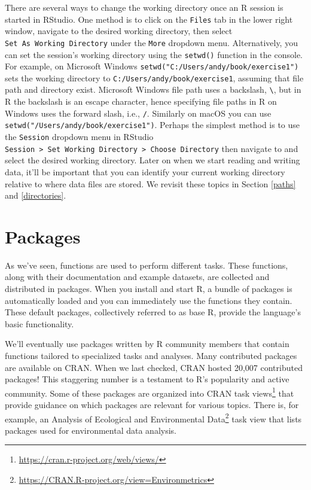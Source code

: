 \documentclass[
  11pt,
]{krantz}
\renewcommand{\href}[2]{#2\footnote{\url{#1}}}
\theoremstyle{definition}
\theoremstyle{definition}
\theoremstyle{definition}
\theoremstyle{definition}
\theoremstyle{remark}
\begin{document}
There are several ways to change the working directory once an R session is started in RStudio. One method is to click on the \texttt{Files} tab in the lower right window, navigate to the desired working directory, then select \texttt{Set\ As\ Working\ Directory} under the \texttt{More} dropdown menu. Alternatively, you can set the session's working directory using the \texttt{setwd()} function in the console. For example, on Microsoft Windows \texttt{setwd("C:/Users/andy/book/exercise1")} sets the working directory to \texttt{C:/Users/andy/book/exercise1}, assuming that file path and directory exist. Microsoft Windows file path uses a backslash, \texttt{\textbackslash{}}, but in R the backslash is an escape character, hence specifying file paths in R on Windows uses the forward slash, i.e., \texttt{/}. Similarly on macOS you can use \texttt{setwd("/Users/andy/book/exercise1")}. Perhaps the simplest method is to use the \texttt{Session} dropdown menu in RStudio \texttt{Session\ \textgreater{}\ Set\ Working\ Directory\ \textgreater{}\ Choose\ Directory} then navigate to and select the desired working directory. Later on when we start reading and writing data, it'll be important that you can identify your current working directory relative to where data files are stored. We revisit these topics in Section \ref{paths} and \ref{directories}.

\hypertarget{packages}{%
\section{Packages}\label{packages}}

As we've seen, functions are used to perform different tasks. These functions, along with their documentation and example datasets, are collected and distributed in packages. When you install and start R, a bundle of packages is automatically loaded and you can immediately use the functions they contain. These default packages, collectively referred to as base R, provide the language's basic functionality.

We'll eventually use packages written by R community members that contain functions tailored to specialized tasks and analyses. Many contributed packages are available on CRAN. When we last checked, CRAN hosted 20,007 contributed packages! This staggering number is a testament to R's popularity and active community. Some of these packages are organized into CRAN \href{https://cran.r-project.org/web/views/}{task views} that provide guidance on which packages are relevant for various topics. There is, for example, an \href{https://CRAN.R-project.org/view=Environmetrics}{Analysis of Ecological and Environmental Data} task view that lists packages used for environmental data analysis.
\end{document}

